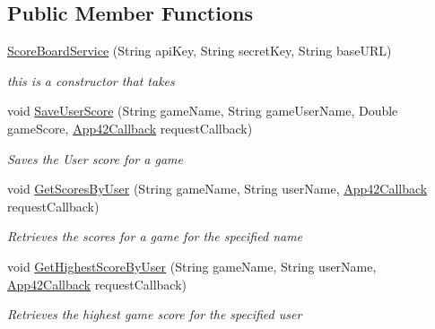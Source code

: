 \subsection*{Public Member Functions}
\begin{DoxyCompactItemize}
\item 
\hyperlink{classcom_1_1shephertz_1_1app42_1_1paas_1_1sdk_1_1windows_1_1game_1_1_score_board_service_a7325cfdf6fea5deb2bb83d9ca95d1b4b}{Score\+Board\+Service} (String api\+Key, String secret\+Key, String base\+U\+R\+L)
\begin{DoxyCompactList}\small\item\em this is a constructor that takes \end{DoxyCompactList}\item 
void \hyperlink{classcom_1_1shephertz_1_1app42_1_1paas_1_1sdk_1_1windows_1_1game_1_1_score_board_service_a98e91658749f519854f77827e8d575e8}{Save\+User\+Score} (String game\+Name, String game\+User\+Name, Double game\+Score, \hyperlink{interfacecom_1_1shephertz_1_1app42_1_1paas_1_1sdk_1_1windows_1_1_app42_callback}{App42\+Callback} request\+Callback)
\begin{DoxyCompactList}\small\item\em Saves the User score for a game \end{DoxyCompactList}\item 
void \hyperlink{classcom_1_1shephertz_1_1app42_1_1paas_1_1sdk_1_1windows_1_1game_1_1_score_board_service_a8900485b05bb5fdc0067fddb09aaa82a}{Get\+Scores\+By\+User} (String game\+Name, String user\+Name, \hyperlink{interfacecom_1_1shephertz_1_1app42_1_1paas_1_1sdk_1_1windows_1_1_app42_callback}{App42\+Callback} request\+Callback)
\begin{DoxyCompactList}\small\item\em Retrieves the scores for a game for the specified name \end{DoxyCompactList}\item 
void \hyperlink{classcom_1_1shephertz_1_1app42_1_1paas_1_1sdk_1_1windows_1_1game_1_1_score_board_service_aae5450ba644e3b46138c85db7b3e1c7b}{Get\+Highest\+Score\+By\+User} (String game\+Name, String user\+Name, \hyperlink{interfacecom_1_1shephertz_1_1app42_1_1paas_1_1sdk_1_1windows_1_1_app42_callback}{App42\+Callback} request\+Callback)
\begin{DoxyCompactList}\small\item\em Retrieves the highest game score for the specified user \end{DoxyCompactList}\item 

\end{DoxyCompactItemize}
